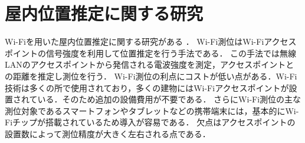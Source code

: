 


\section{屋内位置推定に関する研究}\label{2.1}


Wi-Fiを用いた屋内位置推定に関する研究がある\cite{wifi0} \cite{wifi1}．
Wi-Fi測位はWi-Fiアクセスポイントの信号強度を利用して位置推定を行う手法である．
この手法では無線LANのアクセスポイントから発信される電波強度を測定，アクセスポイントとの距離を推定し測位を行う．
Wi-Fi測位の利点にコストが低い点がある．Wi-Fi技術は多くの所で使用されており，多くの建物にはWi-Fiアクセスポイントが設置されている．そのため追加の設備費用が不要である．
さらにWi-Fi測位の主な測位対象であるスマートフォンやタブレットなどの携帯端末には，基本的にWi-Fiチップが搭載されているため導入が容易である．
欠点はアクセスポイントの設置数によって測位精度が大きく左右される点である．



